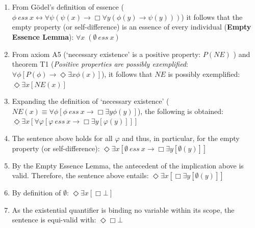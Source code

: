 \documentclass{llncs}
\newcommand{\imp}{{\rightarrow}}
\newcommand{\biimp}{\leftrightarrow}
\newcommand{\allq}{\forall}
\newcommand{\exq}{\exists}
\newcommand{\Dia}{\Diamond} %
\newcommand{\NE}{\mathit{NE}}
\newcommand{\ess}[2]{#1\ \mathit{ess}\ #2}
\newcommand{\nec}{\Box}
\newcommand{\pos}{\Dia}
\begin{document}
\begin{enumerate}
\item From G\"odel's definition of essence 
(${\ess{\phi}{x} \biimp {\allq \psi} (\psi(x)
\imp {\nec} \allq y (\phi(y) \imp \psi(y)))}$) it follows that the
empty property (or self-difference) is an essence of every individual
(\textbf{Empty Essence Lemma}): \hfill $\allq x\; (\ess{\emptyset}{x})$

\item From axiom A5 (`necessary existence' is a positive
  property: $P(\NE)$ ) and theorem T1 (\textit{Positive properties are possibly
  exemplified}: ${\allq \phi} [P(\phi) \imp {\pos}  \exq x
  \phi(x)]$), it follows that $\NE$ is possibly exemplified:
  \hfill $  \pos \exq x [\NE(x)] $
 
\item Expanding the definition of `necessary existence'
  (${\NE(x) \equiv \allq \phi [\ess{\phi}{x} \imp \nec \exq y
    \phi(y)]}$), the following is obtained: \hfill $  \pos \exq x
  [\allq \varphi [ \ess{\varphi}{x} \imp \nec \exq y [\varphi(y)] ] ] $

\item The sentence above holds for all $\varphi$ and thus, in
  particular, for the empty property (or self-difference): \hfill $\pos \exq x [ \ess{\emptyset}{x} \imp \nec \exq y [\emptyset(y)] ]$

\item By the Empty Essence Lemma, the antecedent of the implication
  above is valid. Therefore, the sentence above entails: \hfill $\pos \exq x [ \nec \exq y [\emptyset(y)] ]$ 

\item By definition of $\emptyset$: \hfill $\pos \exq x [ \nec \bot ]$

\item As the existential quantifier is binding no variable within its
  scope, the sentence is equi-valid with: \hfill $\pos \nec \bot $


\end{enumerate}
\end{document}
